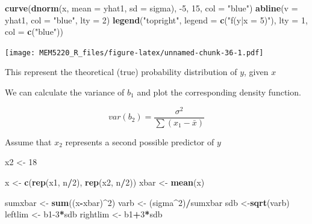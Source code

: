 \documentclass[]{book}
\newenvironment{Shaded}{\begin{snugshade}}{\end{snugshade}}
\newcommand{\DataTypeTok}[1]{\textcolor[rgb]{0.13,0.29,0.53}{#1}}
\newcommand{\DecValTok}[1]{\textcolor[rgb]{0.00,0.00,0.81}{#1}}
\newcommand{\KeywordTok}[1]{\textcolor[rgb]{0.13,0.29,0.53}{\textbf{#1}}}
\newcommand{\NormalTok}[1]{#1}
\newcommand{\OperatorTok}[1]{\textcolor[rgb]{0.81,0.36,0.00}{\textbf{#1}}}
\newcommand{\StringTok}[1]{\textcolor[rgb]{0.31,0.60,0.02}{#1}}
\begin{document}
\begin{Shaded}
\begin{Highlighting}[]
\KeywordTok{curve}\NormalTok{(}\KeywordTok{dnorm}\NormalTok{(x, }\DataTypeTok{mean =}\NormalTok{ yhat1, }\DataTypeTok{sd =}\NormalTok{ sigma), }\DecValTok{-5}\NormalTok{, }\DecValTok{15}\NormalTok{, }\DataTypeTok{col =} \StringTok{"blue"}\NormalTok{)}
\KeywordTok{abline}\NormalTok{(}\DataTypeTok{v =}\NormalTok{ yhat1, }\DataTypeTok{col =} \StringTok{"blue"}\NormalTok{, }\DataTypeTok{lty =} \DecValTok{2}\NormalTok{)}
\KeywordTok{legend}\NormalTok{(}\StringTok{"topright"}\NormalTok{, }\DataTypeTok{legend =} \KeywordTok{c}\NormalTok{(}\StringTok{"f(y|x = 5)"}\NormalTok{), }\DataTypeTok{lty =} \DecValTok{1}\NormalTok{, }\DataTypeTok{col =} \KeywordTok{c}\NormalTok{(}\StringTok{"blue"}\NormalTok{))}
\end{Highlighting}
\end{Shaded}

\texttt{[image: MEM5220\_R\_files/figure-latex/unnamed-chunk-36-1.pdf]}

This represent the theoretical (true) probability distribution of \(y\),
given \(x\)

We can calculate the variance of \(b_{1}\) and plot the corresponding
density function.

\begin{equation}
var(b_2) = \frac{\sigma^2}{\sum{}{}(x_1 - \bar{x})}
\label{eq:variancebeta}
\end{equation}

Assume that \(x_{2}\) represents a second possible predictor of \(y\)

\begin{Shaded}
\begin{Highlighting}[]
\NormalTok{x2 <-}\StringTok{ }\DecValTok{18}

\NormalTok{x <-}\StringTok{ }\KeywordTok{c}\NormalTok{(}\KeywordTok{rep}\NormalTok{(x1, n}\OperatorTok{/}\DecValTok{2}\NormalTok{), }\KeywordTok{rep}\NormalTok{(x2, n}\OperatorTok{/}\DecValTok{2}\NormalTok{))}
\NormalTok{xbar <-}\StringTok{ }\KeywordTok{mean}\NormalTok{(x)}

\NormalTok{sumxbar <-}\StringTok{ }\KeywordTok{sum}\NormalTok{((x}\OperatorTok{-}\NormalTok{xbar)}\OperatorTok{^}\DecValTok{2}\NormalTok{)}
\NormalTok{varb <-}\StringTok{ }\NormalTok{(sigma}\OperatorTok{^}\DecValTok{2}\NormalTok{)}\OperatorTok{/}\NormalTok{sumxbar}
\NormalTok{sdb <-}\KeywordTok{sqrt}\NormalTok{(varb)}
\NormalTok{leftlim <-}\StringTok{ }\NormalTok{b1}\DecValTok{-3}\OperatorTok{*}\NormalTok{sdb}
\NormalTok{rightlim <-}\StringTok{ }\NormalTok{b1}\OperatorTok{+}\DecValTok{3}\OperatorTok{*}\NormalTok{sdb}
\end{Highlighting}
\end{Shaded}
\end{document}
